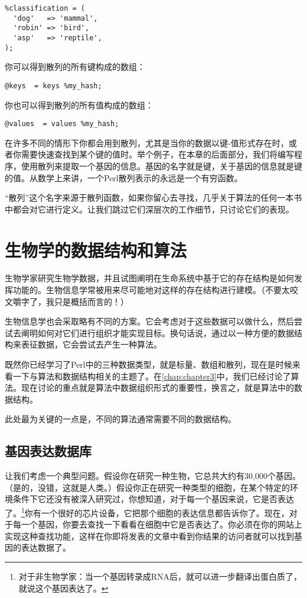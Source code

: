 \begin{lstlisting}
%classification = (
  'dog'   => 'mammal',
  'robin' => 'bird',
  'asp'   => 'reptile',
);
\end{lstlisting}

你可以得到散列的所有键构成的数组：

\begin{lstlisting}
@keys  = keys %my_hash;
\end{lstlisting}

你也可以得到散列的所有值构成的数组：

\begin{lstlisting}
@values  = values %my_hash;
\end{lstlisting}

在许多不同的情形下你都会用到散列，尤其是当你的数据以键-值形式存在时，或者你需要快速查找到某个键的值时。举个例子，在本章的后面部分，我们将编写程序，使用散列来提取一个基因的信息。基因的名字就是键，关于基因的信息就是键的值。从数学上来讲，一个Perl散列表示的永远是一个有穷函数。

“散列”这个名字来源于散列函数，如果你留心去寻找，几乎关于算法的任何一本书中都会对它进行定义。让我们跳过它们深层次的工作细节，只讨论它们的表现。

\section{生物学的数据结构和算法}
生物学家研究生物学数据，并且试图阐明在生命系统中基于它的存在结构是如何发挥功能的。生物信息学常被用来尽可能地对这样的存在结构进行建模。（不要太咬文嚼字了，我只是概括而言的！）

生物信息学也会采取略有不同的方案。它会考虑对于这些数据可以做什么，然后尝试去阐明如何对它们进行组织才能实现目标。换句话说，通过以一种方便的数据结构来表征数据，它会尝试去产生一种算法。

既然你已经学习了Perl中的三种数据类型，就是标量、数组和散列，现在是时候来看一下与算法和数据结构相关的主题了。在\autoref{chap:chapter3}中，我们已经讨论了算法。现在讨论的重点就是算法中数据组织形式的重要性，换言之，就是算法中的数据结构。

此处最为关键的一点是，不同的算法通常需要不同的数据结构。

\subsection{基因表达数据库}
让我们考虑一个典型问题。假设你在研究一种生物，它总共大约有30,000个基因。（是的，没错，这就是人类。）假设你正在研究一种类型的细胞，在某个特定的环境条件下它还没有被深入研究过，你想知道，对于每一个基因来说，它是否表达了。\footnote{对于非生物学家：当一个基因转录成RNA后，就可以进一步翻译出蛋白质了，就说这个基因表达了。}你有一个很好的芯片设备，它把那个细胞的表达信息都告诉你了。现在，对于每一个基因，你要去查找一下看看在细胞中它是否表达了。你必须在你的网站上实现这种查找功能，这样在你即将发表的文章中看到你结果的访问者就可以找到基因的表达数据了。

